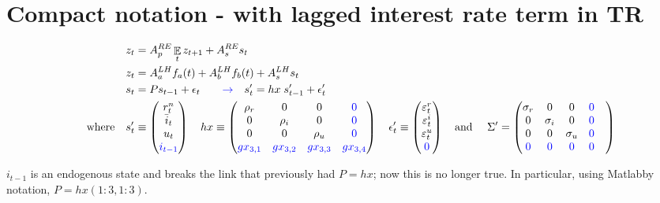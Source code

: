 \documentclass[11pt]{article}
\renewcommand{\[}{\begin{equation}}
\renewcommand{\]}{\end{equation}}
\DeclareMathOperator{\E}{\mathbb{E}}
\begin{document}
\section{Compact notation - with lagged interest rate term in TR}
 \begin{align}
z_t & = A_p^{RE} \E_t z_{t+1} + A_s^{RE} s_t \label{LOM_RE} \\
z_t & = A_a^{LH} f_a(t) + A_b^{LH} f_b(t) + A_s^{LH} s_t \label{LOM_LH} \\
s_t & = P s_{t-1} + \epsilon_t \quad \quad \textcolor{blue}{\rightarrow} \quad s'_t  = hx \; s'_{t-1} + \epsilon'_t \label{exog} \\
 \quad \text{where} \quad 
 s'_t & \equiv \begin{pmatrix} r_t^n \\ \bar{i}_t \\ u_t \\ \textcolor{blue}{i_{t-1}}
 \end{pmatrix} \quad 
 hx  \equiv \begin{pmatrix} \rho_r & 0 & 0 & \textcolor{blue}{0} \\ 0& \rho_i & 0 & \textcolor{blue}{0} \\ 0&0& \rho_u & \textcolor{blue}{0}  \\ 
 \textcolor{blue}{gx_{3,1}}&\textcolor{blue}{gx_{3,2}}& \textcolor{blue}{gx_{3,3}} & \textcolor{blue}{gx_{3,4}}
 \end{pmatrix}  \quad 
 \epsilon'_t \equiv \begin{pmatrix}\varepsilon_t^{r} \\ \varepsilon_t^{i}  \\ \varepsilon_t^{u} \\ \textcolor{blue}{0} 
 \end{pmatrix}  \quad  \text{and } \quad \Sigma'  =  \begin{pmatrix} \sigma_r & 0 & 0 & \textcolor{blue}{0} \\ 0& \sigma_i & 0 & \textcolor{blue}{0}  \\ 0&0& \sigma_u & \textcolor{blue}{0}  \\ \textcolor{blue}{0}  & \textcolor{blue}{0} & \textcolor{blue}{0} & \textcolor{blue}{0} &
 \end{pmatrix} 
\end{align}

$i_{t-1}$ is an endogenous state and breaks the link that previously had $P = hx$; now this is no longer true. In particular, using Matlabby notation, $P = hx(1:3,1:3)$. 
\end{document}
